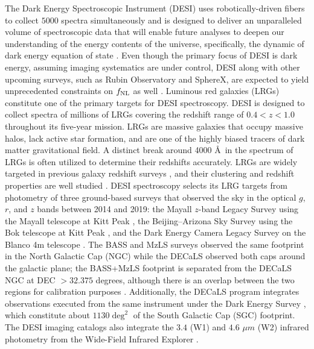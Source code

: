  The Dark Energy Spectroscopic Instrument (DESI) uses robotically-driven fibers to collect $5000$ spectra simultaneously and is designed to deliver an unparalleled volume of spectroscopic data that will enable future analyses to deepen our understanding of the energy contents of the universe, specifically, the dynamic of dark energy equation of state \citep{aghamousa2016desi}. Even though the primary focus of DESI is dark energy, assuming imaging systematics are under control, DESI along with other upcoming surveys, such as Rubin Observatory and SphereX, are expected to yield unprecedented constraints on $f_{\rm NL}$ as well \citep[see, e.g.,][]{Heinrich2022AAS...24020203H}. Luminous red galaxies (LRGs) constitute one of the primary targets for DESI spectroscopy. DESI is designed to collect spectra of millions of LRGs covering the redshift range of $0.4<z<1.0$ throughout its five-year mission. LRGs are massive galaxies that occupy massive halos, lack active star formation, and are one of the highly biased tracers of dark matter gravitational field. A distinct break around 4000 \AA~in the spectrum of LRGs is often utilized to determine their redshifts accurately. LRGs are widely targeted in previous galaxy redshift surveys \citep[see, e.g.,][]{eisenstein2001spectroscopic, prakash2016sdss}, and their clustering and redshift properties are well studied \citep[see, e.g.,][]{ross2020MNRAS.498.2354R, gilmarin2020MNRAS.498.2492G, bautista2021MNRAS.500..736B, chapman2022MNRAS.516..617C}. DESI spectroscopy selects its LRG targets from photometry of three ground-based surveys that observed the sky in the optical $g$, $r$, and $z$ bands between 2014 and 2019: the Mayall $z$-band Legacy Survey using the Mayall telescope at Kitt Peak \citep[MzLS;][]{dey2018overview}, the Beijing–Arizona Sky Survey using the Bok telescope at Kitt Peak \citep[BASS;][]{zou2017project}, and the Dark Energy Camera Legacy Survey on the Blanco 4m telescope \citep[DECaLS][]{flaugher2015dark}. The BASS and MzLS surveys observed the same footprint in the North Galactic Cap (NGC) while the DECaLS observed both caps around the galactic plane; the BASS+MzLS footprint is separated from the DECaLS NGC at DEC $> 32.375$ degrees, although there is an overlap between the two regions for calibration purposes \citep{dey2018overview}. Additionally, the DECaLS program integrates observations executed from the same instrument under the Dark Energy Survey \citep{abbott2016dark}, which constitute about $1130 \deg^{2}$ of the South Galactic Cap (SGC) footprint. The DESI imaging catalogs also integrate the $3.4$ (W1) and $4.6$ $\mu m$ (W2) infrared photometry from the Wide-Field Infrared Explorer \citep[WISE;][]{wise2010AJ....140.1868W, meisner2018RNAAS...2....1M}.  

